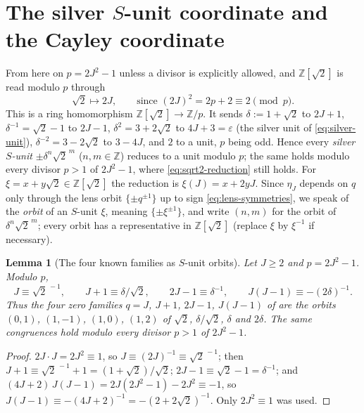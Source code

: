 \documentclass[11pt]{article}
\newtheorem{lemma}[theorem]{Lemma}
\theoremstyle{definition}
\newcommand{\Z}{\mathbb Z}
\begin{document}
\section{The silver \texorpdfstring{$S$}{S}-unit coordinate and the Cayley coordinate}
\label{sec:sunit}

From here on $p=2J^2-1$ unless a divisor is explicitly
allowed, and $\Z[\sqrt2]$ is read modulo $p$ through
\begin{equation}
 \sqrt2\longmapsto2J,\qquad\text{since }(2J)^2=2p+2\equiv2\pmod p .
 \label{eq:sqrt2-reduction}
\end{equation}
This is a ring homomorphism $\Z[\sqrt2]\to\Z/p$.  It sends
$\delta:=1+\sqrt2$ to $2J+1$, $\delta^{-1}=\sqrt2-1$ to $2J-1$,
$\delta^2=3+2\sqrt2$ to $4J+3=\varepsilon$ (the silver unit of
\eqref{eq:silver-unit}), $\delta^{-2}=3-2\sqrt2$ to $3-4J$, and $2$ to a
unit, $p$ being odd.  Hence every \emph{silver $S$-unit}
$\pm\delta^n\sqrt2^{\,m}$ ($n,m\in\Z$) reduces to a unit modulo $p$; the
same holds modulo every divisor $p>1$ of $2J^2-1$, where
\eqref{eq:sqrt2-reduction} still holds.  For $\xi=x+y\sqrt2\in\Z[\sqrt2]$
the reduction is $\xi(J)=x+2yJ$.  Since $\eta_J$ depends on $q$ only
through the lens orbit $\{\pm q^{\pm1}\}$ up to sign
\eqref{eq:lens-symmetries}, we speak of the \emph{orbit} of an $S$-unit
$\xi$, meaning $\{\pm\xi^{\pm1}\}$, and write $(n,m)$ for the orbit of
$\delta^n\sqrt2^{\,m}$; every orbit has a representative in $\Z[\sqrt2]$
(replace $\xi$ by $\xi^{-1}$ if necessary).

\begin{lemma}[The four known families as $S$-unit orbits]
\label{lem:sunit-four}
Let $J\geq2$ and $p=2J^2-1$.  Modulo $p$,
\[
 J\equiv\sqrt2^{\,-1},\qquad J+1\equiv\delta/\sqrt2,\qquad
 2J-1\equiv\delta^{-1},\qquad J(J-1)\equiv-(2\delta)^{-1}.
\]
Thus the four zero families $q=J$, $J+1$, $2J-1$, $J(J-1)$ of
\cite[Thm.~7.1]{MahmoodP1Collection2026} are the orbits $(0,1)$,
$(1,-1)$, $(1,0)$, $(1,2)$ of $\sqrt2$, $\delta/\sqrt2$, $\delta$ and
$2\delta$.  The same congruences hold modulo every divisor $p>1$ of
$2J^2-1$.
\end{lemma}

\begin{proof}
$2J\cdot J=2J^2\equiv1$, so $J\equiv(2J)^{-1}\equiv\sqrt2^{\,-1}$; then
$J+1\equiv\sqrt2^{\,-1}+1=(1+\sqrt2)/\sqrt2$; $2J-1\equiv\sqrt2-1=\delta^{-1}$;
and $(4J+2)\,J(J-1)=2J(2J^2-1)-2J^2\equiv-1$, so
$J(J-1)\equiv-(4J+2)^{-1}=-(2+2\sqrt2)^{-1}$.  Only $2J^2\equiv1$ was
used.
\end{proof}
\end{document}
